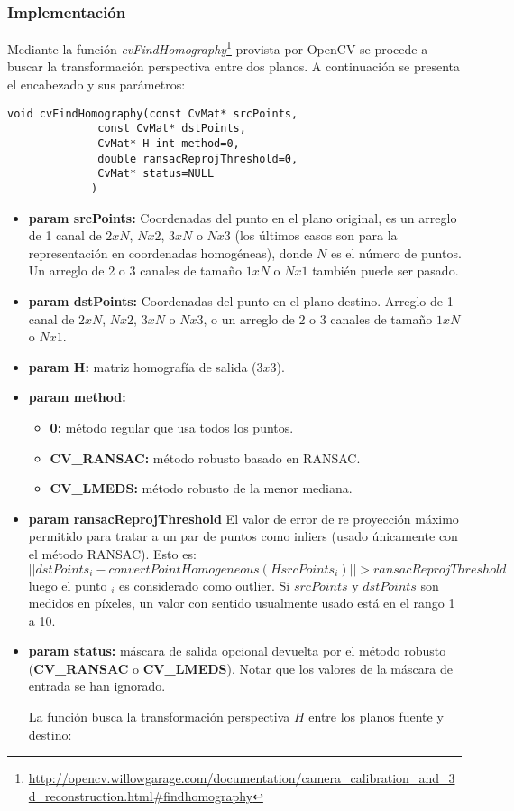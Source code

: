\documentclass[a4paper,11pt,spanish]{article}
\begin{document}
\subsubsection {Implementación}
Mediante la función \emph{cvFindHomography}\footnote{\url{http://opencv.willowgarage.com/documentation/camera_calibration_and_3d_reconstruction.html#findhomography}} provista por OpenCV se procede a buscar la transformación perspectiva entre dos planos. A continuación se presenta el encabezado y sus parámetros:
\begin{lstlisting}
void cvFindHomography(const CvMat* srcPoints, 
		      const CvMat* dstPoints, 
		      CvMat* H int method=0, 
		      double ransacReprojThreshold=0, 
		      CvMat* status=NULL
		     )
\end{lstlisting}
\begin{itemize}
  \item \textbf{param srcPoints:} Coordenadas del punto en el plano original, es un arreglo de 1 canal de $2xN$, $Nx2$, $3xN$ o $Nx3$ (los últimos casos son para la representación en coordenadas homogéneas), donde $N$ es el número de puntos. Un arreglo de 2 o 3 canales de tamaño $1xN$ o $Nx1$ también puede ser pasado.
  \item \textbf{param dstPoints:} Coordenadas del punto en el plano destino. Arreglo de 1 canal de $2xN$, $Nx2$, $3xN$ o $Nx3$, o un arreglo de 2 o 3 canales de tamaño $1xN$ o $Nx1$.
 \item \textbf{param H:} matriz homografía de salida ($3x3$).
 \item \textbf{param method:}
    \begin{itemize}
     \item \textbf{0:} método regular que usa todos los puntos.
     \item \textbf{CV\_RANSAC:} método robusto basado en RANSAC.
     \item \textbf{CV\_LMEDS:} método robusto de la menor mediana.
    \end{itemize}

 \item \textbf{param ransacReprojThreshold} El valor de error de re proyección máximo permitido para tratar a un par de puntos como inliers (usado únicamente con el método RANSAC). Esto es:
  \begin{equation*}
    ||dstPoints_{i} - convertPointHomogeneous(HsrcPoints_{i})||>ransacReprojThreshold
  \end{equation*}
  luego el punto $_{i}$ es considerado como outlier. Si $srcPoints$ y $dstPoints$ son medidos en píxeles, un valor con sentido usualmente usado está en el rango 1 a 10.
 \item \textbf{param status:} máscara de salida opcional devuelta por el método robusto (\textbf{CV\_RANSAC} o \textbf{CV\_LMEDS}). Notar que los valores de la máscara de entrada se han ignorado.

La función busca la transformación perspectiva $H$ entre los planos fuente y destino:
\end{itemize}
\end{document}
